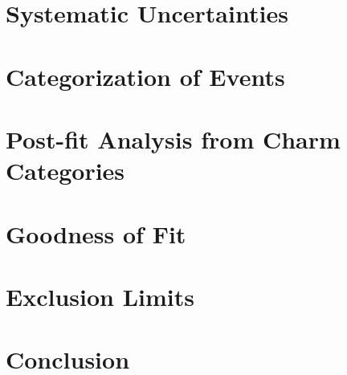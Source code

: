 \documentclass[11pt,twoside,a4paper,an]{cms-tdr}
\begin{document}
\newpage
\section{Systematic Uncertainties}
\label{s:secSys}


\newpage
\section{Categorization of Events}
\label{s:secMjjCat}


\newpage
\section{Post-fit Analysis from Charm Categories}

\label{s:secPostFit}

\newpage
\section{Goodness of Fit}
\label{s:secGOF}


\newpage
\section{Exclusion Limits}
\label{s:secLimit}


\newpage
\section{Conclusion}
\label{s:secConcl}



\newpage

\newpage
\appendix
\end{document}
